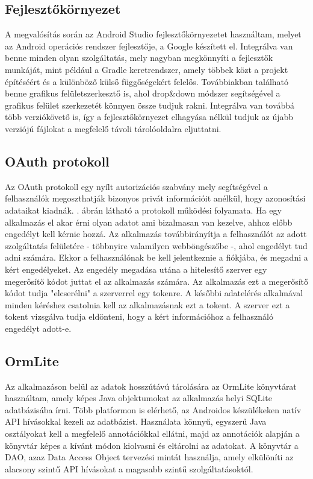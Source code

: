 \subsection{Fejlesztőkörnyezet}
\label{ide}

A megvalósítás során az Android Studio fejlesztőkörnyezetet használtam, melyet az Android operációs rendszer fejlesztője, a Google készített el. 
Integrálva van benne minden olyan szolgáltatás, mely nagyban megkönnyíti a fejlesztők munkáját, mint például a Gradle keretrendszer, amely többek közt a projekt építéséért és a különböző külső függőségekért felelős. 
Továbbiakban található benne grafikus felületszerkesztő is, ahol drop\&down módszer segítségével a grafikus felület szerkezetét könnyen össze tudjuk rakni. 
Integrálva van továbbá több verziókövető is, így a fejlesztőkörnyezet elhagyása nélkül tudjuk az újabb verziójú fájlokat a megfelelő távoli tárolóoldalra eljuttatni. 

\subsection{OAuth protokoll}
\label{oauth}


Az OAuth protokoll \cite{oauthprotocol} egy nyílt autorizációs szabvány mely segítségével a felhasználók megoszthatják bizonyos privát információit anélkül, hogy azonosítási adataikat kiadnák. 
. ábrán látható a protokoll működési folyamata. 
Ha egy alkalmazás el akar érni olyan adatot ami bizalmasan van kezelve, ahhoz előbb engedélyt kell kérnie hozzá. 
Az alkalmazás továbbirányítja a felhasználót az adott szolgáltatás felületére - többnyire valamilyen webböngészőbe -, ahol engedélyt tud adni számára. 
Ekkor a felhasználónak be kell jelentkeznie a fiókjába, és megadni a kért engedélyeket. 
Az engedély megadása utána a hitelesítő szerver egy megerősítő kódot juttat el az alkalmazás számára. 
Az alkalmazás ezt a megerősítő kódot tudja "elcserélni" a szerverrel egy tokenre. 
A későbbi adatelérés alkalmával minden kéréshez csatolnia kell az alkalmazásnak ezt a tokent. 
A szerver ezt a tokent vizsgálva tudja eldönteni, hogy a kért információhoz a felhasználó engedélyt adott-e. 

\subsection{OrmLite}
\label{ormlite}

Az alkalmazáson belül az adatok hosszútávú tárolására az OrmLite könyvtárat \cite{ormlite} használtam, amely képes Java objektumokat az alkalmazás helyi SQLite adatbázisába írni. 
Több platformon is elérhető, az Androidos készülékeken natív API hívásokkal kezeli az adatbázist. 
Használata könnyű, egyszerű Java osztályokat kell a megfelelő annotációkkal ellátni, majd az annotációk alapján a könyvtár képes a kívánt módon kiolvasni és eltárolni az adatokat. 
A könyvtár a DAO, azaz Data Access Object tervezési mintát használja, amely elkülöníti az alacsony szintű API hívásokat a magasabb szintű szolgáltatásoktól. 
